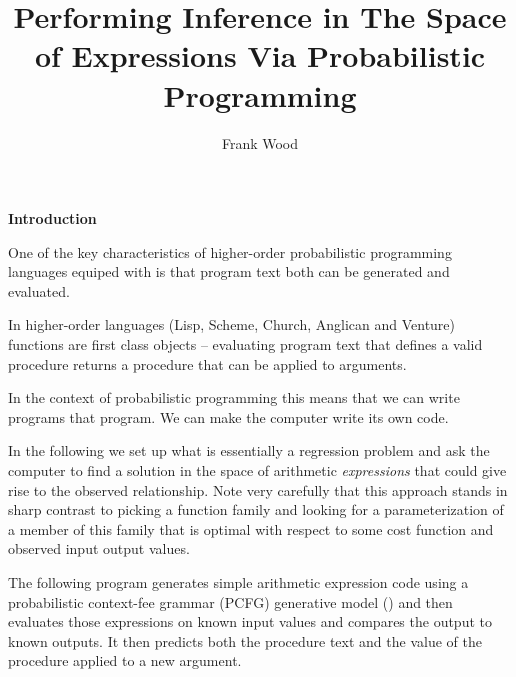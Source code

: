\documentclass[11pt,reqno]{amsart}
\title{Performing Inference in The Space of Expressions Via Probabilistic Programming}
\author{Frank Wood}
\newcommand{\+}[1]{\ensuremath{{\mathbf{#1}}}}
\begin{document}
\maketitle


{\bf Introduction}
\vspace{.5cm}

One of the key characteristics of higher-order probabilistic programming languages equiped with  is that program text both can be generated and evaluated.

In higher-order languages (Lisp, Scheme, Church, Anglican and Venture) functions are first class objects -- evaluating program text that defines a valid procedure returns a procedure that can be applied to arguments.

In the context of probabilistic programming this means that we can write programs that program.  We can make the computer write its own code.  

In the following we set up what is essentially a regression problem and ask the computer to find a solution in the space of arithmetic {\em expressions} that could give rise to the observed relationship.  Note very carefully that this approach stands in sharp contrast to picking a function family and looking for a parameterization of a member of this family that is optimal with respect to some cost function and observed input output values.  

The following program generates simple arithmetic expression code using a probabilistic context-fee grammar (PCFG) \cite{johnson1998pcfg} generative model () and then evaluates those expressions on known input values and compares the output to known outputs.  It then predicts both the procedure text and the value of the procedure applied to a new argument.   
\end{document}
